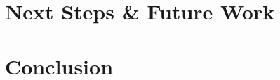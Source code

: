 
\section{Next Steps \& Future Work}
\label{sec:futurework}


\section{Conclusion}
\label{sec:conclusion}

